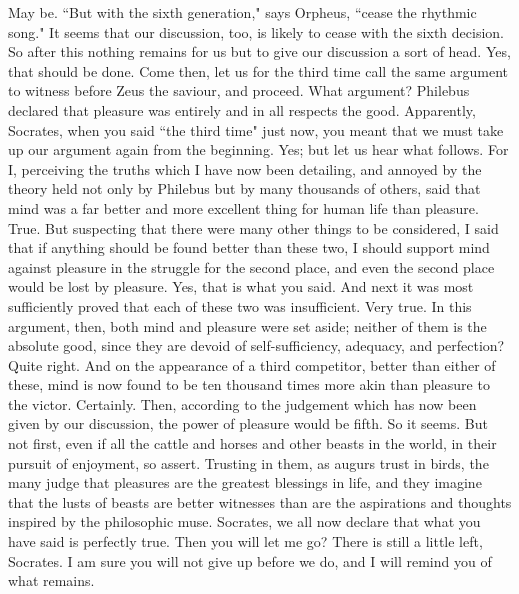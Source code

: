 \documentclass[letterpaper,12pt]{article}
\newcommand{\stephpag}[1]{\marginnote{\small\itshape\fontfamily{ppl}\selectfont #1}}
\begin{document}
\begin{drama}
\protarchusspeaks
May be.
\socratesspeaks
``But with the sixth generation," says Orpheus, ``cease the rhythmic song." It seems that our discussion, too, is likely to cease with the sixth decision. \stephpag{d} So after this nothing remains for us but to give our discussion a sort of head.
\protarchusspeaks
Yes, that should be done.
\socratesspeaks
Come then, let us for the third time call the same argument to witness before Zeus the saviour, and proceed.
\protarchusspeaks
What argument?
\socratesspeaks
Philebus declared that pleasure was entirely and in all respects the good.
\protarchusspeaks
Apparently, Socrates, when you said ``the third time" just now, you meant that we must take up our argument again from the beginning. \stephpag{e}
\socratesspeaks
Yes; but let us hear what follows. For I, perceiving the truths which I have now been detailing, and annoyed by the theory held not only by Philebus but by many thousands of others, said that mind was a far better and more excellent thing for human life than pleasure.
\protarchusspeaks
True.
\socratesspeaks
But suspecting that there were many other things to be considered, I said that if anything should be found better than these two, I should support mind against pleasure in the struggle for the second place, and even the second place would be lost by pleasure. \stephpag{67 a}
\protarchusspeaks
Yes, that is what you said.
\socratesspeaks
And next it was most sufficiently proved that each of these two was insufficient.
\protarchusspeaks
Very true.
\socratesspeaks
In this argument, then, both mind and pleasure were set aside; neither of them is the absolute good, since they are devoid of self-sufficiency, adequacy, and perfection?
\protarchusspeaks
Quite right.
\socratesspeaks
And on the appearance of a third competitor, better than either of these, mind is now found to be ten thousand times more akin than pleasure to the victor.
\protarchusspeaks
Certainly.
\socratesspeaks
Then, according to the judgement which has now been given by our discussion, the power of pleasure would be fifth.
\protarchusspeaks
So it seems. \stephpag{b}
\socratesspeaks
But not first, even if all the cattle and horses and other beasts in the world, in their pursuit of enjoyment, so assert. Trusting in them, as augurs trust in birds, the many judge that pleasures are the greatest blessings in life, and they imagine that the lusts of beasts are better witnesses than are the aspirations and thoughts inspired by the philosophic muse.
\protarchusspeaks
Socrates, we all now declare that what you have said is perfectly true.
\socratesspeaks
Then you will let me go?
\protarchusspeaks
There is still a little left, Socrates. I am sure you will not give up before we do, and I will remind you of what remains.


\end{drama}
\end{document}
